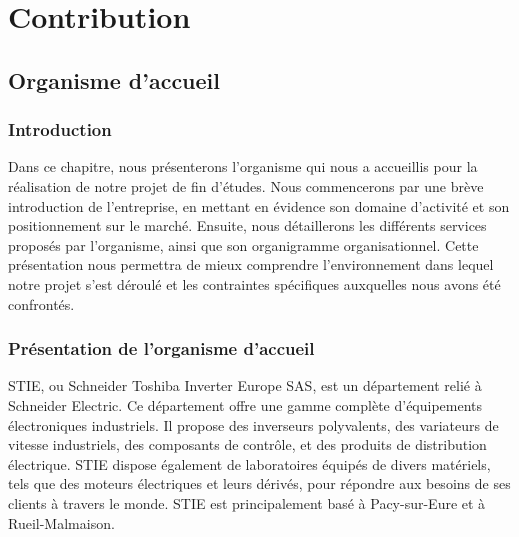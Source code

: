 \part{Contribution}





\chapter{Organisme d’accueil}



\section{Introduction}
Dans ce chapitre, nous présenterons l’organisme qui nous a accueillis pour la réalisation de notre projet de fin d’études. 
Nous commencerons par une brève introduction de l’entreprise, en mettant en évidence son domaine d’activité et son positionnement 
sur le marché. Ensuite, nous détaillerons les différents services proposés par l’organisme, ainsi que son organigramme organisationnel.
Cette présentation nous permettra de mieux comprendre l’environnement dans lequel notre projet s’est déroulé et les contraintes
spécifiques auxquelles nous avons été confrontés.



\section{Présentation de l'organisme d'accueil}
STIE, ou Schneider Toshiba Inverter Europe SAS, est un département relié à Schneider Electric. Ce département offre une
gamme complète d'équipements électroniques industriels. Il propose des inverseurs polyvalents, des variateurs de vitesse 
industriels, des composants de contrôle, et des produits de distribution électrique. STIE dispose également de laboratoires 
équipés de divers matériels, tels que des moteurs électriques et leurs dérivés, pour répondre aux besoins de ses clients à travers
le monde. STIE est principalement basé à Pacy-sur-Eure et à Rueil-Malmaison.

